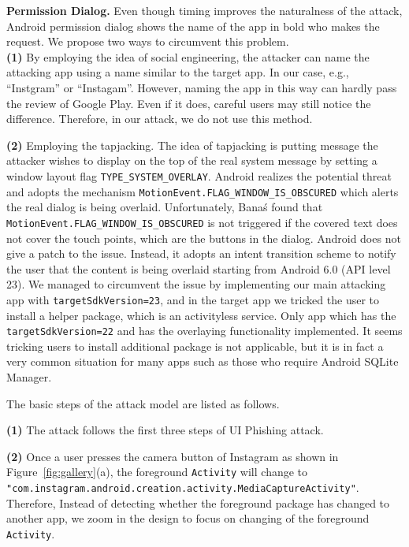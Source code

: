 \documentclass[letterpaper,12pt]{article}
\begin{document}
\noindent\textbf{Permission Dialog.}
Even though timing improves the naturalness of the attack, Android
permission dialog shows the name of the app in bold who makes the
request. We propose two ways to circumvent this
problem.
\\\textbf{(1)} By employing the idea of social engineering, the attacker can name the attacking app 
using a name similar to the target app. In our case,
e.g., ``Instgram'' or ``Instagam''. However, naming the app in this way
can hardly pass the review of Google Play. Even if it does, careful
users may still notice the difference. Therefore, in our attack, we do not
use this method.

\noindent \textbf{(2)} Employing the tapjacking. The idea of tapjacking
is putting message the attacker wishes to display on the top of the
real system message by setting a window layout flag
\texttt{TYPE\_SYSTEM\_OVERLAY}. Android realizes the potential threat
and adopts the mechanism
\texttt{MotionEvent.FLAG\_WINDOW\_IS\_OBSCURED} which alerts the real
dialog is being overlaid\cite{flagwindowobscured}. Unfortunately,
Bana\'s\cite{TapjackingIwo} found that \\
\texttt{MotionEvent.FLAG\_WINDOW\_IS\_OBSCURED} is not triggered if
the covered text does not cover the touch points, which are the
buttons in the dialog. Android does not give a patch to the issue.
Instead, it adopts an intent transition scheme to notify the user that
the content is being overlaid starting from Android 6.0 (API level
23). We managed to circumvent the issue by implementing our main
attacking app with \texttt{targetSdkVersion=23}, and in the target app
we tricked the user to install a helper package, which is an
activityless service.  Only app which has the
\texttt{targetSdkVersion=22} and has the overlaying functionality
implemented. It seems tricking users to install additional package is
not applicable, but it is in fact a very common situation for many
apps such as those who require Android SQLite Manager.

The basic steps of the attack model are listed as
follows.

\textbf{(1)} The attack follows the first three steps of UI Phishing
attack.

\textbf{(2)} Once a user presses the camera button of Instagram as
shown in Figure~\ref{fig:gallery}(a), the foreground \texttt{Activity}
will change to
\texttt{"com.instagram.android.creation.\-activity.MediaCaptureActivity"}. Therefore,
Instead of detecting whether the foreground package has changed to
another app, we zoom in the design to focus on changing of the
foreground \texttt{Activity}.
\end{document}
